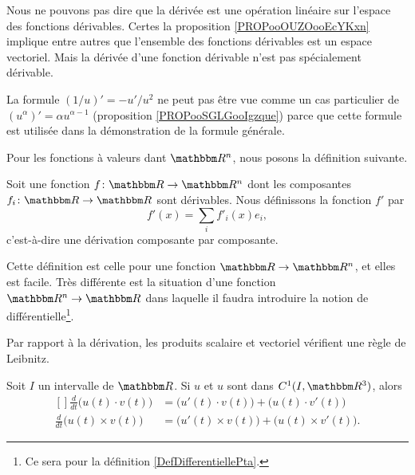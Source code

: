 \begin{remark}
    Nous ne pouvons pas dire que la dérivée est une opération linéaire sur l'espace des fonctions dérivables. Certes la proposition \ref{PROPooOUZOooEcYKxn} implique entre autres que l'ensemble des fonctions dérivables est un espace vectoriel. Mais la dérivée d'une fonction dérivable n'est pas spécialement dérivable.
\end{remark}

\begin{remark}
    La formule \( (1/u)'=-u'/u^2\) ne peut pas être vue comme un cas particulier de \( (u^{\alpha})'=\alpha u^{\alpha-1}\) (proposition \ref{PROPooSGLGooIgzque}) parce que cette formule est utilisée dans la démonstration de la formule générale.
\end{remark}


Pour les fonctions à valeurs dant \( \eR^n\), nous posons la définition suivante.
\begin{definition}
    Soit une fonction \( f\colon \eR\to \eR^n\) dont les composantes \( f_i\colon \eR\to \eR\) sont dérivables. Nous définissons la fonction \( f'\) par
    \begin{equation}
        f'(x)=\sum_if'_i(x)e_i,
    \end{equation}
    c'est-à-dire une dérivation composante par composante.
\end{definition}

Cette définition est celle pour une fonction \( \eR\to \eR^n\), et elles est facile. Très différente est la situation d'une fonction \( \eR^n\to \eR\) dans laquelle il faudra introduire la notion de différentielle\footnote{Ce sera pour la définition \ref{DefDifferentiellePta}.}.

Par rapport à la dérivation, les produits scalaire et vectoriel vérifient une règle de Leibnitz. 
\begin{proposition}     \label{PROPooFKKHooQZGXhE}
    Soit $I$ un intervalle de $\eR$. Si $u$ et $u$ sont dans $C^1(I,\eR^3)$, alors
    \begin{equation}		\label{EqFormLeibProdscalVect}
        \begin{aligned}[]
            \frac{ d }{ dt }\big( u(t)\cdot v(t) \big)&=\big( u'(t)\cdot v(t) \big)+\big( u(t)\cdot v'(t) \big)\\
            \frac{ d }{ dt }\big( u(t)\times v(t) \big)&=\big( u'(t)\times v(t) \big)+\big( u(t)\times v'(t) \big).
        \end{aligned}
    \end{equation}
\end{proposition}

